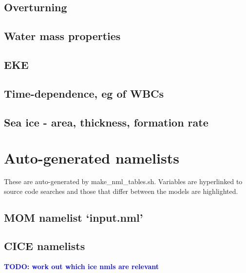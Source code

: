 \documentclass[11pt]{article}
\newcommand{\note}[1]{#1} %
\newcommand{\TODO}[1]{\note{\textcolor{blue}{\textsf{\textbf{TODO: #1}}}}}
\begin{document}
\subsection{Overturning}

\subsection{Water mass properties}

\subsection{EKE}

\subsection{Time-dependence, eg of WBCs}

\subsection{Sea ice - area, thickness, formation rate}

\appendix
\section{Auto-generated namelists}

\newcommand{\differ}[1]{\colorbox{hilite}{#1}} %
\newcommand{\link}[2]{#1} %
\setlength{\fboxsep}{0pt}

These are auto-generated by make\_nml\_tables.sh.
Variables are hyperlinked to source code searches and those that differ between the models are \differ{highlighted}.

\subsection{MOM namelist `input.nml'}
\renewcommand{\link}[2]{\href{https://github.com/mom-ocean/MOM5/search?q=#2}{#1}} %
{\tiny }

\subsection{CICE namelists}
\renewcommand{\link}[2]{\href{https://github.com/OceansAus/cice5/search?q=#2}{#1}} %
\TODO{work out which ice nmls are relevant}
\end{document}
